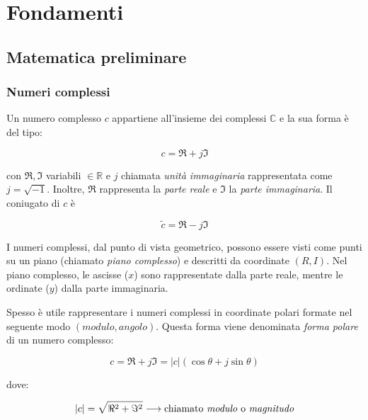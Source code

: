 \documentclass[a4paper]{article}
\begin{document}
	\tableofcontents
	
	\newpage
	
	\section{Fondamenti}
	
	\subsection{Matematica preliminare}
	
	\subsubsection{Numeri complessi}
	
	Un numero complesso $c$ appartiene all'insieme dei complessi $\mathbb{C}$ e la sua forma è del tipo:

	\begin{equation*}
		c = \Re + j \Im
	\end{equation*}

	\noindent
	con $\Re, \Im$ variabili $\in\mathbb{R}$ e $j$ chiamata \emph{unità immaginaria} rappresentata come $j = \sqrt{-1}$. Inoltre, $\Re$ rappresenta la \emph{parte reale} e $\Im$ la \emph{parte immaginaria}. Il coniugato di $c$ è
	
	\begin{equation*}
		\tilde{c} = \Re - j \Im
	\end{equation*}

	I numeri complessi, dal punto di vista geometrico, possono essere visti come punti su un piano (chiamato \emph{piano complesso}) e descritti da coordinate $(R, I)$. Nel piano complesso, le ascisse ($x$) sono rappresentate dalla parte reale, mentre le ordinate ($y$) dalla parte immaginaria.
	
	Spesso è utile rappresentare i numeri complessi in coordinate polari formate nel seguente modo $\left(modulo, angolo\right)$. Questa forma viene denominata \emph{forma polare} di un numero complesso:
	
	\begin{equation*}
		c = \Re + j \Im = |c| (\cos{\theta} + j \sin{\theta})
	\end{equation*}

	\noindent
	dove:
	
	\begin{equation*}
		|c| = \sqrt{\Re^2 + \Im^2} \longrightarrow \text{chiamato \emph{modulo} o \emph{magnitudo}}
	\end{equation*}
\end{document}

